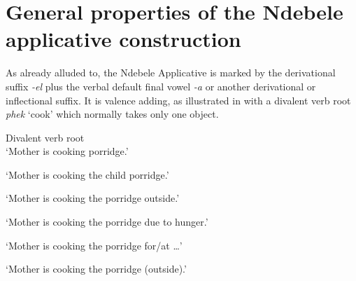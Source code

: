 \documentclass[output=paper]{langsci/langscibook}
\begin{document}
\section{General properties of the Ndebele applicative construction}\label{sec:sibanda:}

As already alluded to, the Ndebele Applicative is marked by the derivational suffix \textit{\textit{-el}} plus the verbal default final vowel \textit{-a} or another derivational or inflectional suffix. It is valence adding, as illustrated in  with a divalent verb root \textit{phek} ‘cook’ which normally takes only one object. 

\ea\label{ex:sibanda:2}
\settowidth{}
{Divalent verb root} \\
\glt ‘Mother is cooking porridge.’

\glt ‘Mother is cooking the child porridge.’

\glt ‘Mother is cooking the porridge outside.’

\glt ‘Mother is cooking the porridge due to hunger.’

\glt ‘Mother is cooking the porridge for/at …’

\glt ‘Mother is cooking the porridge (outside).’
\z
\z
\end{document}
